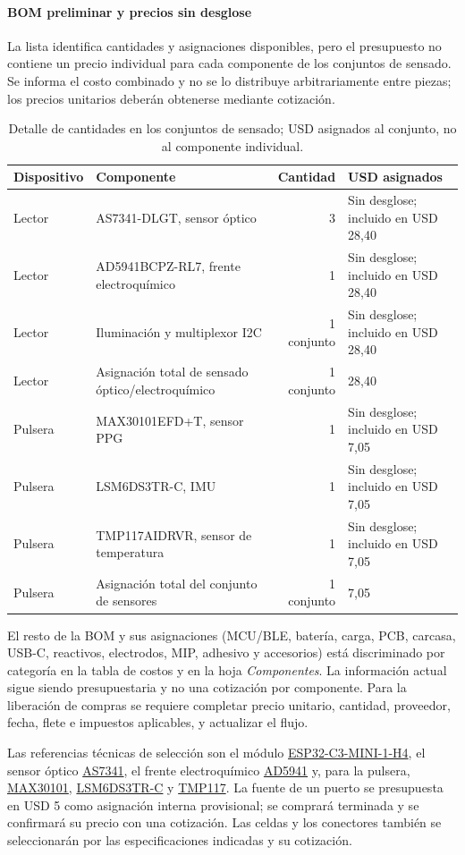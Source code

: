 \paragraph{BOM preliminar y precios sin desglose}
La lista identifica cantidades y asignaciones disponibles, pero el presupuesto no contiene un precio individual para cada componente de los conjuntos de sensado. Se informa el costo combinado y no se lo distribuye arbitrariamente entre piezas; los precios unitarios deberán obtenerse mediante cotización.
\begin{table}[H]\centering\small
\caption{Detalle de cantidades en los conjuntos de sensado; USD asignados al conjunto, no al componente individual.}
\begin{tabularx}{\linewidth}{l X r X}\toprule
Dispositivo & Componente & Cantidad & USD asignados\\\midrule
Lector & AS7341-DLGT, sensor óptico & 3 & Sin desglose; incluido en USD 28,40\\
Lector & AD5941BCPZ-RL7, frente electroquímico & 1 & Sin desglose; incluido en USD 28,40\\
Lector & Iluminación y multiplexor I2C & 1 conjunto & Sin desglose; incluido en USD 28,40\\
\midrule
Lector & Asignación total de sensado óptico/electroquímico & 1 conjunto & 28,40\\
\midrule
Pulsera & MAX30101EFD+T, sensor PPG & 1 & Sin desglose; incluido en USD 7,05\\
Pulsera & LSM6DS3TR-C, IMU & 1 & Sin desglose; incluido en USD 7,05\\
Pulsera & TMP117AIDRVR, sensor de temperatura & 1 & Sin desglose; incluido en USD 7,05\\
\midrule
Pulsera & Asignación total del conjunto de sensores & 1 conjunto & 7,05\\
\bottomrule
\end{tabularx}\end{table}
El resto de la BOM y sus asignaciones (MCU/BLE, batería, carga, PCB, carcasa, USB-C, reactivos, electrodos, MIP, adhesivo y accesorios) está discriminado por categoría en la tabla de costos y en la hoja \textit{Componentes}. La información actual sigue siendo presupuestaria y no una cotización por componente. Para la liberación de compras se requiere completar precio unitario, cantidad, proveedor, fecha, flete e impuestos aplicables, y actualizar el flujo.

Las referencias técnicas de selección son el módulo \href{https://www.lcsc.com/product-detail/C2934569.html}{ESP32-C3-MINI-1-H4}, el sensor óptico \href{https://www.lcsc.com/product-detail/C2655145.html}{AS7341}, el frente electroquímico \href{https://www.analog.com/en/products/ad5941.html}{AD5941} y, para la pulsera, \href{https://www.lcsc.com/product-detail/C2859066.html}{MAX30101}, \href{https://www.lcsc.com/product-detail/C967633.html}{LSM6DS3TR-C} y \href{https://www.ti.com/product/TMP117}{TMP117}. La fuente de un puerto se presupuesta en USD 5 como asignación interna provisional; se comprará terminada y se confirmará su precio con una cotización. Las celdas y los conectores también se seleccionarán por las especificaciones indicadas y su cotización.

